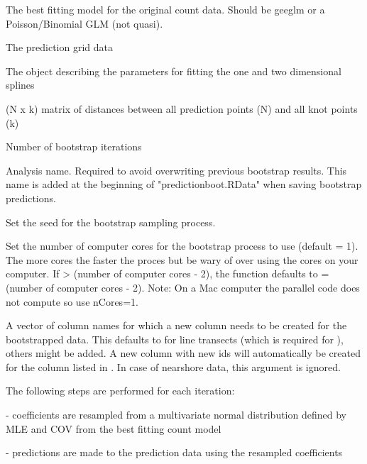 \documentclass[a4paper]{book}
\begin{document}
\begin{Arguments}
\begin{ldescription}
\item[\code{model.obj}] The best fitting  model for the original count data. Should be geeglm or a Poisson/Binomial GLM (not quasi).

\item[\code{predictionGrid}] The prediction grid data

\item[\code{splineParams}] The object describing the parameters for fitting the one and two dimensional splines

\item[\code{g2k}] (N x k) matrix of distances between all prediction points (N) and all knot points (k)

\item[\code{B}] Number of bootstrap iterations

\item[\code{name}] Analysis name. Required to avoid overwriting previous bootstrap results. This name is added at the beginning of "predictionboot.RData" when saving bootstrap predictions.

\item[\code{seed}] Set the seed for the bootstrap sampling process.

\item[\code{nCores}] Set the number of computer cores for the bootstrap process to use (default = 1).  The more cores the faster the proces but be wary of over using the cores on your computer. If  > (number of computer cores - 2), the function defaults to  = (number of computer cores - 2).  Note: On a Mac computer the parallel code does not compute so use nCores=1.

\item[\code{rename}] A vector of column names for which a new column needs to be created for the bootstrapped data. This defaults to  for line transects (which is required for ), others might be added.
A new column with new ids will automatically be created for the column listed in . In case of nearshore data, this argument is ignored.
\end{ldescription}
\end{Arguments}
%
\begin{Details}\relax
The following steps are performed for each iteration:

- coefficients are resampled from a multivariate normal distribution defined by MLE and COV from the best fitting count model

- predictions are made to the prediction data using the resampled coefficients
\end{Details}
\end{document}
